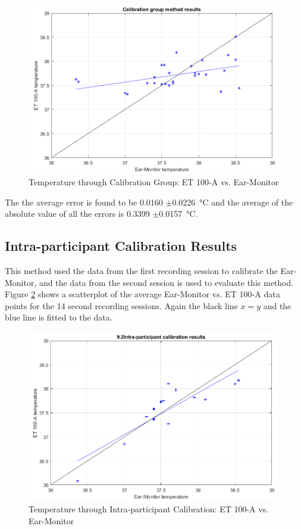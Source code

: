 \begin{figure}[H]
   \centering
   \includegraphics[width=12cm,height=7.5cm]{figs/Temp1Scatter.png}
   \caption{Temperature through Calibration Group: ET 100-A vs. Ear-Monitor}
   \label{fig:Temp1Scatter}
\end{figure}

The the average error is found to be 0.0160 $\pm$\SI{0.0226}{\celsius} and the average of the absolute value of all the errors is 0.3399 $\pm$\SI{0.0157}{\celsius}.

\subsection{Intra-participant Calibration Results}
This method used the data from the first recording session to calibrate the Ear-Monitor, and the data from the second session is used to evaluate this method. Figure \ref{fig:Temp2Scatter} shows a scatterplot of the average Ear-Monitor vs. ET 100-A data points for the 14 second recording sessions. Again the black line $x=y$ and the blue line is fitted to the data.

\begin{figure}[H]
   \centering
   \includegraphics[width=12cm,height=7.5cm]{figs/Temp2Scatter.png}
   \caption{Temperature through Intra-participant Calibration: ET 100-A vs. Ear-Monitor}
   \label{fig:Temp2Scatter}
\end{figure}

